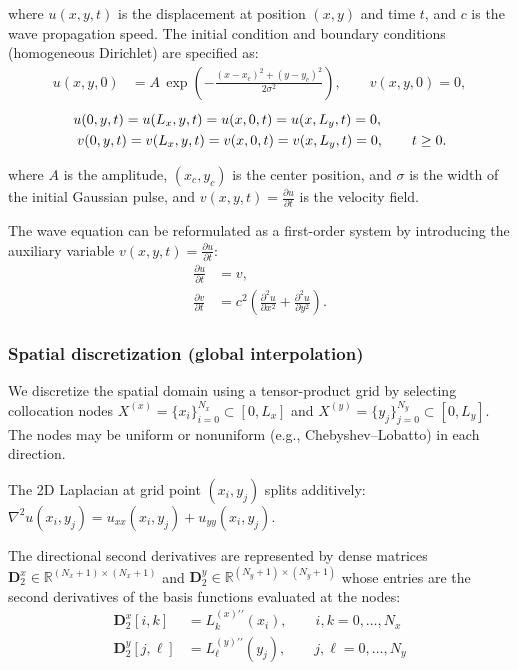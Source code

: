 where $u(x,y,t)$ is the displacement at position $(x,y)$ and time $t$, and $c$ is the wave propagation speed. The initial condition and boundary conditions (homogeneous Dirichlet) are specified as:
\begin{align}
u(x,y,0) &= A\,\exp\!\left(-\frac{(x-x_c)^2+(y-y_c)^2}{2\sigma^2}\right), \qquad v(x,y,0) = 0,
\label{eq:initial_conditions_2d}
\end{align}
\vspace{-0.75em}
\begin{align}
u(0,y,t) = u(L_x,y,t) = u(x,0,t) = u(x,L_y,t) = 0, \hspace{4.7em}\\
v(0,y,t) = v(L_x,y,t) = v(x,0,t) = v(x,L_y,t) = 0, \qquad t\ge 0.
\label{eq:boundary_conditions_2d}
\end{align}

where $A$ is the amplitude, $(x_c,y_c)$ is the center position, and $\sigma$ is the width of the initial Gaussian pulse, and $v(x,y,t) = \frac{\partial u}{\partial t}$ is the velocity field.

The wave equation can be reformulated as a first-order system by introducing the auxiliary variable $v(x,y,t) = \frac{\partial u}{\partial t}$:
\begin{equation}
\begin{aligned}
\frac{\partial u}{\partial t} &= v, \\
\frac{\partial v}{\partial t} &= c^2 \left(\frac{\partial^2 u}{\partial x^2} + \frac{\partial^2 u}{\partial y^2}\right).
\end{aligned}
\label{eq:coupled_system_2d}
\end{equation}

\subsubsection*{Spatial discretization (global interpolation)}

We discretize the spatial domain using a tensor-product grid by selecting collocation nodes
$X^{(x)}=\{x_i\}_{i=0}^{N_x}\subset[0,L_x]$ and $X^{(y)}=\{y_j\}_{j=0}^{N_y}\subset[0,L_y]$. The nodes may be uniform or nonuniform (e.g., Chebyshev–Lobatto) in each direction.

The 2D Laplacian at grid point $(x_i,y_j)$ splits additively: $\nabla^2 u(x_i,y_j) = u_{xx}(x_i,y_j) + u_{yy}(x_i,y_j)$.

The directional second derivatives are represented by dense matrices $\mathbf{D}_2^x\in\mathbb{R}^{(N_x+1)\times(N_x+1)}$ and $\mathbf{D}_2^y\in\mathbb{R}^{(N_y+1)\times(N_y+1)}$ whose entries are the second derivatives of the basis functions evaluated at the nodes:
\begin{align}
\mathbf{D}_2^x[i,k] &= L_k^{(x)\prime\prime}(x_i),\qquad i,k=0,\dots,N_x \\
\mathbf{D}_2^y[j,\ell] &= L_\ell^{(y)\prime\prime}(y_j),\qquad j,\ell=0,\dots,N_y
\label{eq:D2xy_def_wave}
\end{align}

